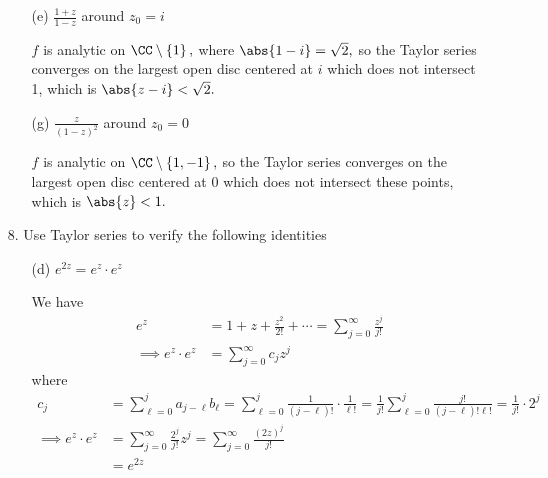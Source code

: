 \documentclass{article}
\begin{document}
\begin{itemize}
\begin{itemize}
			\item[(e)] $\frac{1+z}{1-z}$ around $z_0=i$
				\begin{soln}
					$f$ is analytic on $\CC\setminus\left\{ 1 \right\},$ where $\abs{1-i} = \sqrt{2},$ so the Taylor series converges on the largest open disc centered at $i$ which does not intersect 1, which is $\abs{z-i}<\sqrt{2}.$
				\end{soln}

			\item[(g)] $\frac{z}{(1-z)^2}$ around $z_0=0$ 
				\begin{soln}
					$f$ is analytic on $\CC\setminus\left\{ 1, -1 \right\},$ so the Taylor series converges on the largest open disc centered at 0 which does not intersect these points, which is $\abs{z}<1.$
				\end{soln}
				
		\end{itemize}

	\item[8.] Use Taylor series to verify the following identities
		\begin{itemize}
			\item[(d)] $e^{2z}=e^z\cdot e^z$
				\begin{soln}
					We have
					\begin{align*}
						e^z &= 1 + z + \frac{z^2}{2!} + \cdots = \sum_{j=0}^{\infty} \frac{z^j}{j!} \\
						\implies e^z\cdot e^z &= \sum_{j=0}^{\infty} c_j z^j
					\end{align*}
					where
					\begin{align*}
						c_j &= \sum_{\ell=0}^{j} a_{j-\ell}b_\ell = \sum_{\ell=0}^{j} \frac{1}{(j-\ell)!}\cdot \frac{1}{\ell!} = \frac{1}{j!} \sum_{\ell=0}^{j} \frac{j!}{(j-\ell)!\ell!} = \frac{1}{j!}\cdot 2^j \\
						\implies e^z\cdot e^z &= \sum_{j=0}^{\infty} \frac{2^j}{j!} z^j = \sum_{j=0}^{\infty} \frac{(2z)^j}{j!} \\
						&= e^{2z}
					\end{align*}
				\end{soln}
				
		\end{itemize}


\end{itemize}
\end{document}
